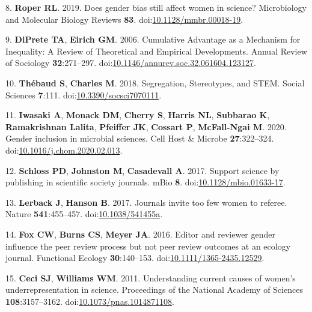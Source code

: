 \documentclass[11pt,]{article}
\begin{document}
\leavevmode\hypertarget{ref-Roper2019}{}%
8. \textbf{Roper RL}. 2019. Does gender bias still affect women in
science? Microbiology and Molecular Biology Reviews \textbf{83}.
doi:\href{https://doi.org/10.1128/mmbr.00018-19}{10.1128/mmbr.00018-19}.

\leavevmode\hypertarget{ref-diprete_cumulative_2006}{}%
9. \textbf{DiPrete TA}, \textbf{Eirich GM}. 2006. Cumulative Advantage
as a Mechanism for Inequality: A Review of Theoretical and Empirical
Developments. Annual Review of Sociology \textbf{32}:271--297.
doi:\href{https://doi.org/10.1146/annurev.soc.32.061604.123127}{10.1146/annurev.soc.32.061604.123127}.

\leavevmode\hypertarget{ref-thebaud_segregation_2018}{}%
10. \textbf{Thébaud S}, \textbf{Charles M}. 2018. Segregation,
Stereotypes, and STEM. Social Sciences \textbf{7}:111.
doi:\href{https://doi.org/10.3390/socsci7070111}{10.3390/socsci7070111}.

\leavevmode\hypertarget{ref-Iwasaki2020}{}%
11. \textbf{Iwasaki A}, \textbf{Monack DM}, \textbf{Cherry S},
\textbf{Harris NL}, \textbf{Subbarao K}, \textbf{Ramakrishnan
\textnormal{Lalita}}, \textbf{Pfeiffer JK}, \textbf{Cossart P},
\textbf{McFall-Ngai M}. 2020. Gender inclusion in microbial sciences.
Cell Host \& Microbe \textbf{27}:322--324.
doi:\href{https://doi.org/10.1016/j.chom.2020.02.013}{10.1016/j.chom.2020.02.013}.

\leavevmode\hypertarget{ref-Schloss2017}{}%
12. \textbf{Schloss PD}, \textbf{Johnston M}, \textbf{Casadevall A}.
2017. Support science by publishing in scientific society journals. mBio
\textbf{8}.
doi:\href{https://doi.org/10.1128/mbio.01633-17}{10.1128/mbio.01633-17}.

\leavevmode\hypertarget{ref-lerback_journals_2017}{}%
13. \textbf{Lerback J}, \textbf{Hanson B}. 2017. Journals invite too few
women to referee. Nature \textbf{541}:455--457.
doi:\href{https://doi.org/10.1038/541455a}{10.1038/541455a}.

\leavevmode\hypertarget{ref-fox_editor_2016}{}%
14. \textbf{Fox CW}, \textbf{Burns CS}, \textbf{Meyer JA}. 2016. Editor
and reviewer gender influence the peer review process but not peer
review outcomes at an ecology journal. Functional Ecology
\textbf{30}:140--153.
doi:\href{https://doi.org/10.1111/1365-2435.12529}{10.1111/1365-2435.12529}.

\leavevmode\hypertarget{ref-ceci_understanding_2011}{}%
15. \textbf{Ceci SJ}, \textbf{Williams WM}. 2011. Understanding current
causes of women's underrepresentation in science. Proceedings of the
National Academy of Sciences \textbf{108}:3157--3162.
doi:\href{https://doi.org/10.1073/pnas.1014871108}{10.1073/pnas.1014871108}.
\end{document}
